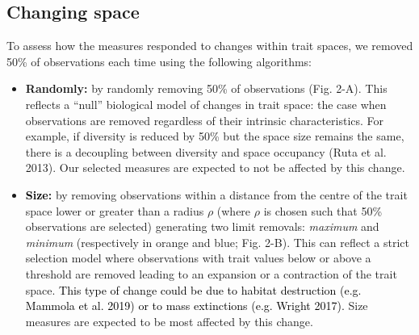 \documentclass[]{article}
\begin{document}
\subsection{Changing space}\label{changing-spaces}

To assess how the measures responded to changes within trait spaces, we
removed 50\% of observations each time using the following algorithms:

\begin{itemize}
\item
  \textbf{Randomly:} by randomly removing 50\% of observations (Fig.
  2-A). This reflects a ``null'' biological model of changes in trait
  space: the case when observations are removed regardless of their
  intrinsic characteristics. For example, if diversity is reduced by
  50\% but the space size remains the same, there is a decoupling
  between diversity and space occupancy (Ruta et al. 2013). Our selected
  measures are expected to not be affected by this change.
\item
  \textbf{\textcolor{black}{Size}:} by removing
  observations within a distance from the centre of the trait space
  lower or greater than a radius \(\rho\) (where \(\rho\) is chosen such
  that 50\% observations are selected) generating two limit removals:
  \emph{maximum} and \emph{minimum} (respectively in orange and blue;
  Fig. 2-B). This can reflect a strict selection model where
  observations with trait values below or above a threshold are removed
  leading to an expansion or a contraction of the trait space.
  \textcolor{black}{This type of change could be due to
  habitat destruction (e.g. Mammola et al. 2019) or to mass extinctions
  (e.g. Wright 2017).} Size measures are expected to be most affected
  by this change.
\end{itemize}
\end{document}
